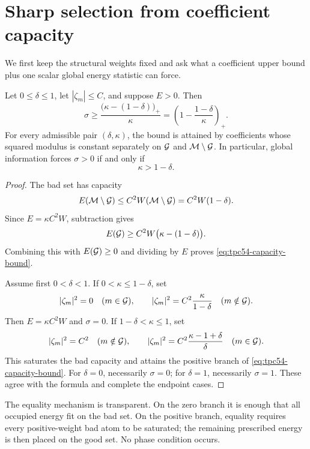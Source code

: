 \section{Sharp selection from coefficient capacity}
\label{sec:capacity}

We first keep the structural weights fixed and ask what a coefficient
upper bound plus one scalar global energy statistic can force.

\begin{theorem}
\label{thm:tpc54-capacity}
Let \(0\le\delta\le1\), let \(|\zeta_m|\le C\), and suppose \(E>0\).
Then
\begin{equation}
 \boxed{\quad
 \sigma\ge
 \frac{\bigl(\kappa-(1-\delta)\bigr)_+}{\kappa}
 =\left(1-\frac{1-\delta}{\kappa}\right)_+ .
 \quad}
 \label{eq:tpc54-capacity-bound}
\end{equation}
For every admissible pair \((\delta,\kappa)\), the bound is attained by
coefficients whose squared modulus is constant separately on \(\mathcal G\) and
\(\mathcal M\setminus\mathcal G\).  In particular, global information forces
\(\sigma>0\) if and only if
\begin{equation}
 \kappa>1-\delta.
 \label{eq:tpc54-positive-threshold}
\end{equation}
\end{theorem}

\begin{proof}
The bad set has capacity
\[
 E(\mathcal M\setminus\mathcal G)
 \le C^2W(\mathcal M\setminus\mathcal G)
 =C^2W(1-\delta).
\]
Since \(E=\kappa C^2W\), subtraction gives
\[
 E(\mathcal G)\ge
 C^2W\bigl(\kappa-(1-\delta)\bigr).
\]
Combining this with \(E(\mathcal G)\ge0\) and dividing by \(E\) proves
\eqref{eq:tpc54-capacity-bound}.

Assume first \(0<\delta<1\).  If \(0<\kappa\le1-\delta\), set
\[
 |\zeta_m|^2=0\quad(m\in\mathcal G),
 \qquad
 |\zeta_m|^2=C^2\frac{\kappa}{1-\delta}
 \quad(m\notin\mathcal G).
\]
Then \(E=\kappa C^2W\) and \(\sigma=0\).  If
\(1-\delta<\kappa\le1\), set
\[
 |\zeta_m|^2=C^2
 \quad(m\notin\mathcal G),
 \qquad
 |\zeta_m|^2=C^2\frac{\kappa-1+\delta}{\delta}
 \quad(m\in\mathcal G).
\]
This saturates the bad capacity and attains the positive branch of
\eqref{eq:tpc54-capacity-bound}.  For \(\delta=0\), necessarily
\(\sigma=0\); for \(\delta=1\), necessarily \(\sigma=1\).  These agree
with the formula and complete the endpoint cases.
\end{proof}

The equality mechanism is transparent.  On the zero branch it is enough
that all occupied energy fit on the bad set.  On the positive branch,
equality requires every positive-weight bad atom to be saturated; the
remaining prescribed energy is then placed on the good set.  No phase
condition occurs.


